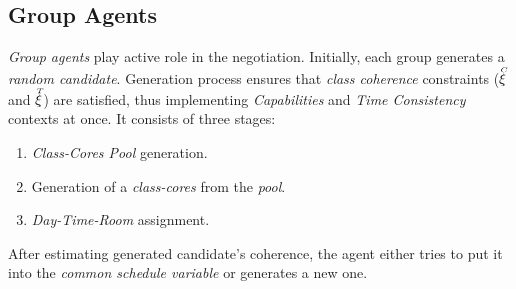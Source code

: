 \documentclass[../../ThesisDoc]{subfiles}
\begin{document}
\providecommand{\rootdir}{../..}


\providecommand{\seccmd}[1]{\secpartc{#1}}

\subsection{Group Agents}

\emph{Group agents} play active role in the negotiation.
Initially, each group generates a \emph{random candidate}.
Generation process ensures that \emph{class coherence} constraints
($\accentset{C}{\xi}$ and $\accentset{T}{\xi}$) are satisfied, thus implementing \textit{Capabilities}
and \textit{Time Consistency} contexts at once. It consists of three stages:
\begin{enumerate}
  \item \emph{Class-Cores Pool} generation.
  \item Generation of a \emph{class-cores} from the \emph{pool}.
  \item \emph{Day-Time-Room} assignment.
\end{enumerate}

\bigskip
{}

\noindent
After estimating generated candidate's coherence, the agent either tries to put
it into the \emph{common schedule variable} or generates a new one.



\end{document}
